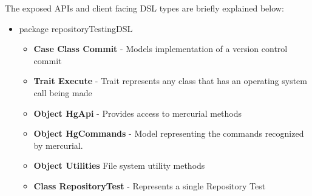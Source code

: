 \noindent
The exposed APIs and client facing DSL types are briefly explained below:

\begin{itemize}
\item package repositoryTestingDSL
    \begin{itemize}
        \item \textbf{Case Class Commit} - Models implementation of a version control commit
        \item \textbf{Trait Execute} - Trait represents any class that has an operating system call being made
        \item \textbf{Object HgApi} - Provides access to mercurial methods
        \item \textbf{Object HgCommands} - Model representing the commands recognized by mercurial.
        \item \textbf{Object Utilities} File system utility methods
        \item \textbf{Class RepositoryTest} - Represents a single Repository Test
\end{itemize}
\end{itemize}

\newpage